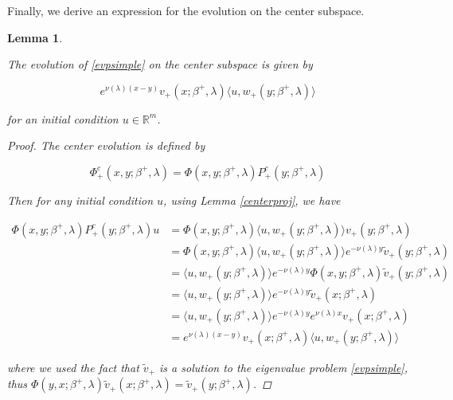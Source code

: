 \documentclass[12pt]{article}
\def\R{{\mathbb R}}
\newtheorem{lemma}{Lemma}
\begin{document}
Finally, we derive an expression for the evolution on the center subspace.


\begin{lemma}\label{centerevol}

The evolution of \eqref{evpsimple} on the center subspace is given by

\begin{equation}
e^{\nu(\lambda)(x-y)} v_+(x; \beta^+, \lambda) \langle u, w_+(y; \beta^+, \lambda) \rangle 
\end{equation}

for an initial condition $u \in \R^m$.

\begin{proof}

The center evolution is defined by

\begin{equation*}
\Phi^c_+(x,y; \beta^+, \lambda) = \Phi(x,y; \beta^+, \lambda) P^c_+(y; \beta^+, \lambda)
\end{equation*}

Then for any initial condition $u$, using Lemma \ref{centerproj}, we have

\begin{align*}
\Phi(x,y; \beta^+, \lambda) P^c_+(y; \beta^+, \lambda) u 
&= \Phi(x,y; \beta^+, \lambda) \langle u, w_+(y; \beta^+, \lambda) \rangle v_+(y; \beta^+, \lambda) \\
&= \Phi(x,y; \beta^+, \lambda) \langle u, w_+(y; \beta^+, \lambda) \rangle e^{-\nu(\lambda)y} \tilde{v}_+(y; \beta^+, \lambda) \\
&= \langle u, w_+(y; \beta^+, \lambda) \rangle e^{-\nu(\lambda)y} \Phi(x,y; \beta^+, \lambda) \tilde{v}_+(y; \beta^+, \lambda) \\
&= \langle u, w_+(y; \beta^+, \lambda) \rangle e^{-\nu(\lambda)y} \tilde{v}_+(x; \beta^+, \lambda) \\
&= \langle u, w_+(y; \beta^+, \lambda) \rangle e^{-\nu(\lambda)y} e^{\nu(\lambda)x} v_+(x; \beta^+, \lambda) \\
&= e^{\nu(\lambda)(x-y)} v_+(x; \beta^+, \lambda) \langle u, w_+(y; \beta^+, \lambda) \rangle 
\end{align*}

where we used the fact that $\tilde{v}_+$ is a solution to the eigenvalue problem \eqref{evpsimple}, thus $\Phi(y, x; \beta^+, \lambda)\tilde{v}_+(x; \beta^+, \lambda) = \tilde{v}_+(y; \beta^+, \lambda)$. 

\end{proof}
\end{lemma}
\end{document}
